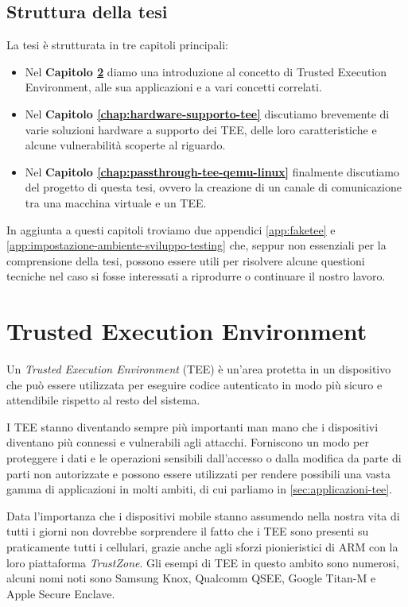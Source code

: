 \documentclass[12pt,italian]{report}
\begin{document}
\section{Struttura della tesi}
\label{sec:struttura-tesi}
La tesi è strutturata in tre capitoli principali:
\begin{itemize}
    \item Nel \textbf{Capitolo \ref{chap:tee}} diamo una introduzione al
    concetto di Trusted Execution Environment, alle sua applicazioni
    e a vari concetti correlati.
    \item Nel \textbf{Capitolo \ref{chap:hardware-supporto-tee}} discutiamo
    brevemente di varie soluzioni hardware a supporto dei TEE, delle loro
    caratteristiche e alcune vulnerabilità scoperte al riguardo.
    \item Nel \textbf{Capitolo \ref{chap:passthrough-tee-qemu-linux}}
    finalmente discutiamo del progetto di questa tesi, ovvero la creazione
    di un canale di comunicazione tra una macchina virtuale e un TEE.
\end{itemize}

In aggiunta a questi capitoli troviamo due appendici \ref{app:faketee} e
\ref{app:impostazione-ambiente-sviluppo-testing} che, seppur non essenziali
per la comprensione della tesi,
possono essere utili per risolvere alcune questioni tecniche
nel caso si fosse interessati a riprodurre o continuare il nostro lavoro.

\chapter{Trusted Execution Environment}
\label{chap:tee}
Un \textit{Trusted Execution Environment} (TEE) è un'area protetta in un
dispositivo che può essere utilizzata per eseguire codice autenticato in modo
più sicuro e attendibile rispetto al resto del sistema.

I TEE stanno diventando sempre più importanti man mano che i dispositivi
diventano più connessi e vulnerabili agli attacchi.
Forniscono un modo per proteggere i dati e le operazioni sensibili
dall'accesso o dalla modifica da parte di parti non autorizzate e possono
essere utilizzati per rendere possibili una vasta gamma di applicazioni
in molti ambiti, di cui parliamo in \ref{sec:applicazioni-tee}.

Data l'importanza che i dispositivi mobile stanno assumendo nella nostra
vita di tutti i giorni non dovrebbe sorprendere il fatto che i TEE sono
presenti su praticamente tutti i cellulari, grazie anche agli sforzi
pionieristici di ARM con la loro piattaforma \textit{TrustZone}.
Gli esempi di TEE in questo ambito sono numerosi, alcuni nomi noti sono
Samsung Knox, Qualcomm QSEE, Google Titan-M e Apple Secure Enclave.
\end{document}
